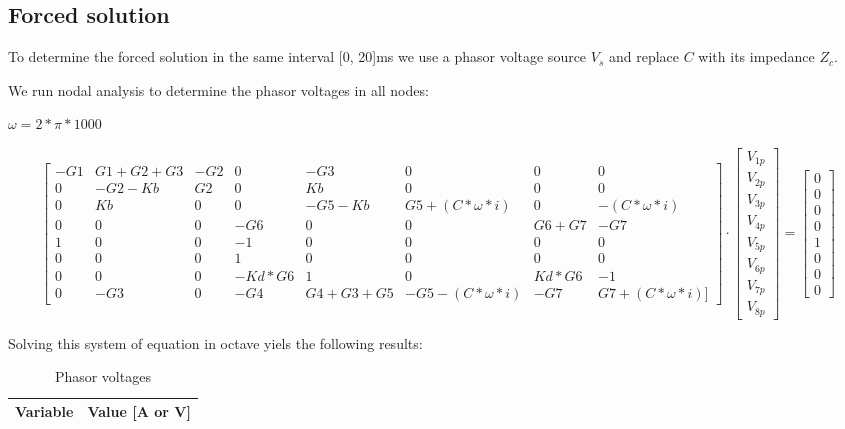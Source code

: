\subsection{Forced solution}

To determine the forced solution in the same interval [0, 20]ms we use a phasor voltage source $V_s$ and replace $C$ with its impedance $Z_c$.

We run nodal analysis to determine the phasor voltages in all nodes:

 $\omega=2*\pi*1000$
 
  \begin{equation}\label{eq:matrixeq3}
\begin{bmatrix}
-G1 & G1+G2+G3 & -G2 & 0 & -G3 & 0 & 0 & 0\\
0 & -G2-Kb & G2 & 0 & Kb & 0 & 0 & 0\\
0 & Kb & 0 & 0 & -G5-Kb & G5+(C*\omega*i) & 0 & -(C*\omega*i)\\
0 & 0 & 0 & -G6 & 0 & 0 & G6+G7 & -G7\\
1 & 0 & 0 & -1 & 0 & 0 & 0 & 0\\
0 & 0 & 0 & 1 & 0 & 0 & 0 & 0\\
0 & 0 & 0 & -Kd*G6 & 1 & 0 & Kd*G6 & -1\\
0 & -G3 & 0 & -G4 & G4+G3+G5 & -G5-(C*\omega*i) & -G7 & G7+(C*\omega*i)]
\end{bmatrix}
\cdot
\begin{bmatrix}
V_{1p} \\
V_{2p} \\
V_{3p} \\
V_{4p} \\
V_{5p} \\
V_{6p} \\
V_{7p} \\
V_{8p} 
    \end{bmatrix}
=
    \begin{bmatrix}
0 \\
0 \\
0 \\
0 \\
1 \\
0 \\
0 \\
0 
    \end{bmatrix}
  \end{equation}



Solving this system of equation in octave yiels the following results:

\begin{table}[H]
    \centering
    \begin{tabular}{|l|r|}
      \hline    
      {\bf Variable} & {\bf Value [A or V]} \\ \hline
    \end{tabular}
    \caption{Phasor voltages}
    \label{tab:phasorvoltages}
  \end{table}
  

